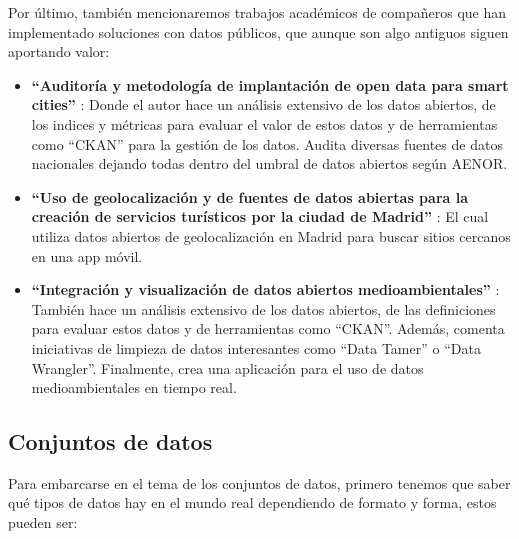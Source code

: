 	Por último, también mencionaremos trabajos académicos de compañeros que han implementado soluciones con datos públicos, que aunque son algo antiguos siguen aportando valor:
	
	\begin{itemize}
			\item \textbf{``Auditoría y metodología de implantación de open data para smart cities''} \citep{MelendrezMoreto2016Auditoria}: Donde el autor hace un análisis extensivo de los datos abiertos, de los indices y métricas para evaluar el valor de estos datos y de herramientas como ``CKAN'' para la gestión de los datos. Audita diversas fuentes de datos nacionales dejando todas dentro del umbral de datos abiertos según AENOR. 
			
			\item \textbf{``Uso de geolocalización y de fuentes de datos abiertas para la creación de servicios turísticos por la ciudad de Madrid''} \citep{LLamoccaPortela2016Integracion}: El cual utiliza datos abiertos de geolocalización en Madrid para buscar sitios cercanos en una app móvil.
			
			\item \textbf{``Integración y visualización de datos abiertos medioambientales''} \citep{ArellanoBruno2019UsoDeGeolocalizacion}: También hace un análisis extensivo de los datos abiertos, de las definiciones para evaluar estos datos y de herramientas como ``CKAN''. Además, comenta iniciativas de limpieza de datos interesantes como ``Data Tamer'' o ``Data Wrangler''. Finalmente, crea una aplicación para el uso de datos medioambientales en tiempo real. \\
	\end{itemize} 
	
\subsection{Conjuntos de datos}

	Para embarcarse en el tema de los conjuntos de datos, primero tenemos que saber qué tipos de datos hay en el mundo real \citep{Sarker2021} dependiendo de formato y forma, estos pueden ser:
	
